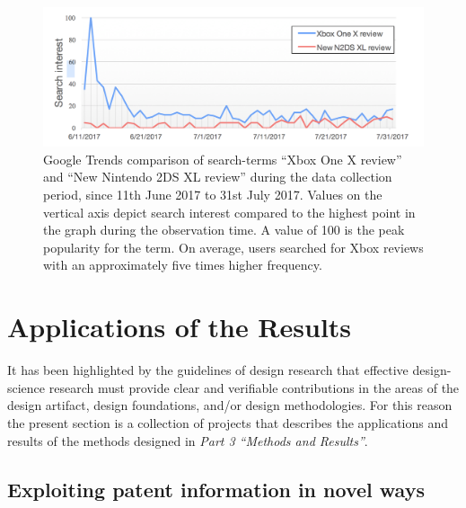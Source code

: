 \documentclass[]{book}
\begin{document}
\begin{figure}

{\centering \includegraphics[width=1\linewidth]{_bookdown_files/figures/tweet_search_interest} 

}

\caption{Google Trends comparison of search-terms “Xbox One X review” and “New Nintendo 2DS XL review” during the data collection period, since 11th June 2017 to 31st July 2017. Values on the vertical axis depict search interest compared to the highest point in the graph during the observation time. A value of 100 is the peak popularity for the term. On average, users searched for Xbox reviews with an approximately five times higher frequency.}\label{fig:tweetsearchinterest}
\end{figure}

\part{Applications of the
Results}\label{part-applications-of-the-results}

It has been highlighted by the guidelines of design research
\citep{bichler2006design} that effective design-science research must
provide clear and verifiable contributions in the areas of the design
artifact, design foundations, and/or design methodologies. For this
reason the present section is a collection of projects that describes
the applications and results of the methods designed in \emph{Part 3
``Methods and Results''}.

\chapter{Exploiting patent information in novel
ways}\label{exploiting-patent-information-in-novel-ways}
\end{document}
